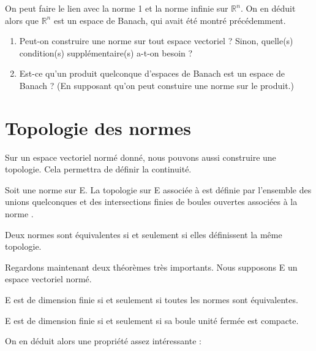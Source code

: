 \begin{exemple}
	On peut faire le lien avec la norme 1 et la norme infinie sur
	$\mathbb{R}^{n}$. On en déduit alors que $\mathbb{R}^{n}$ est un espace de
	Banach, qui avait été montré précédemment.
\end{exemple}

\begin{question}
	\begin{enumerate}
		\item Peut-on construire une norme sur tout espace vectoriel ?
			Sinon, quelle(s) condition(s) supplémentaire(s) a-t-on besoin ?
		\item Est-ce qu'un produit quelconque d'espaces de Banach est un
			espace de Banach ? (En supposant qu'on peut constuire une norme
			sur le produit.)
	\end{enumerate}
\end{question}

\section{Topologie des normes}

Sur un espace vectoriel normé donné, nous pouvons aussi construire une
topologie. Cela permettra de définir la continuité.

\begin{definition}
	Soit une norme  sur E. La topologie sur E associée à 
	est définie par l'ensemble des unions quelconques et des intersections
	finies de boules ouvertes associées à la norme .
\end{definition}

\begin{proposition}
	Deux normes sont équivalentes si et seulement si elles définissent la même topologie.
\end{proposition}

Regardons maintenant deux théorèmes très importants. Nous supposons E un espace
vectoriel normé.

\begin{theorem}
	E est de dimension finie si et seulement si toutes les normes sont équivalentes.
\end{theorem}

\begin{theorem}
	\label{Riesz}
	E est de dimension finie si et seulement si sa boule unité fermée est compacte.
\end{theorem}

On en déduit alors une propriété assez intéressante :

